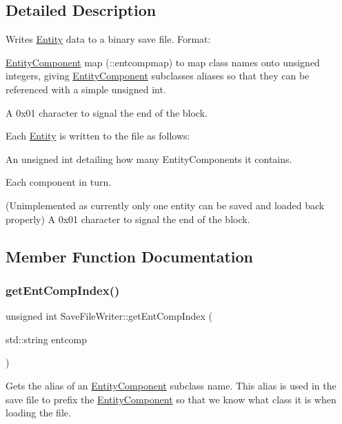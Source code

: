 \subsection{Detailed Description}
Writes \hyperlink{class_entity}{Entity} data to a binary save file. Format\+:
\begin{DoxyItemize}
\item \hyperlink{class_entity_component}{Entity\+Component} map (\+::entcompmap) to map class names onto unsigned integers, giving \hyperlink{class_entity_component}{Entity\+Component} subclasses \textquotesingle{}aliases\textquotesingle{} so that they can be referenced with a simple unsigned int.
\item A 0x01 character to signal the end of the block.
\item Each \hyperlink{class_entity}{Entity} is written to the file as follows\+:
\begin{DoxyItemize}
\item An unsigned int detailing how many Entity\+Components it contains.
\item Each component in turn.
\end{DoxyItemize}
\item (Unimplemented as currently only one entity can be saved and loaded back properly) A 0x01 character to signal the end of the block. 
\end{DoxyItemize}

\subsection{Member Function Documentation}
\mbox{\label{class_save_file_writer_aa5f3b020a4d93f42f274d4c5d7f10b8c}} 
\subsubsection{\texorpdfstring{get\+Ent\+Comp\+Index()}{getEntCompIndex()}}
{\footnotesize\ttfamily unsigned int Save\+File\+Writer\+::get\+Ent\+Comp\+Index (\begin{DoxyParamCaption}\item[{std\+::string}]{entcomp }\end{DoxyParamCaption})}

Gets the alias of an \hyperlink{class_entity_component}{Entity\+Component} subclass\textquotesingle{} name. This alias is used in the save file to prefix the \hyperlink{class_entity_component}{Entity\+Component} so that we know what class it is when loading the file. \mbox{\label{class_save_file_writer_a665e53cc0c04489c5b0872b3f8cd7218}} 
